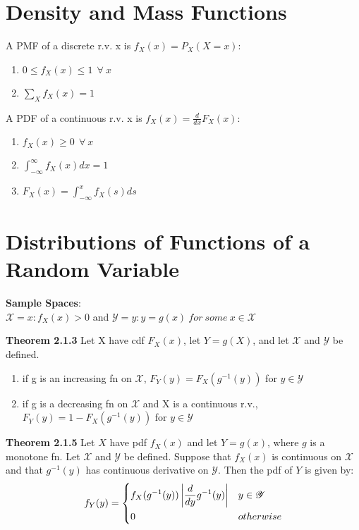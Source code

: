 \documentclass[14pt, oneside, letterpaper]{notes}
\begin{document}
\section*{Density and Mass Functions}

\begin{mydef}
	A PMF of a discrete r.v. x is $f_X(x)=P_X(X=x)$:
	\begin{enumerate}
	\item $0 \leq f_X(x) \leq 1 \: \: \forall \: x$
	\item $\sum_X f_X(x) = 1$
	\end{enumerate}
\end{mydef}

\begin{mydef}
	A PDF of a continuous r.v. x is $f_X(x)= \frac{d}{dx}F_X(x)$:
	\begin{enumerate}
	\item $f_X(x) \geq 0 \: \: \forall \: x$
	\item $\int_{-\infty}^{\infty}f_X(x)dx = 1$
	\item $F_X(x) = \int_{-\infty}^{x}f_X(s)ds $
	\end{enumerate}
\end{mydef}

\section*{Distributions of Functions of a Random Variable}

\begin{mydef}
	\textbf{Sample Spaces}: \\ 
	$\mathscr{X} = {x: f_X(x) > 0}$ and 
	$\mathscr{Y} = {y: y=g(x) \: for \: some \: x \in \mathscr{X}}$
\end{mydef}


\begin{remark}
	\textbf{Theorem 2.1.3} Let X have cdf $F_X(x)$, let $Y = g(X)$,
	and let $\mathscr{X}$ and $\mathscr{Y}$ be defined.
	\begin{enumerate}
	\item if g is an increasing fn on $\mathscr{X}$, $F_Y(y) = 
	F_X(g^{-1}(y)) $ for $y \in \mathscr{Y}$
	\item if g is a decreasing fn on $\mathscr{X}$ and X is
	a continuous r.v., $F_Y(y) = 1- F_X(g^{-1}(y)) $ for 
	$y \in \mathscr{Y}$
	\end{enumerate}
\end{remark}

\begin{remark}
	\textbf{Theorem 2.1.5} Let $X$ have pdf $f_X(x)$ and let $Y = g(x)$,
	where $g$ is a monotone fn.  Let $\mathscr{X}$ and $\mathscr{Y}$ be
	defined.  Suppose that $f_X(x)$ is continuous on $\mathscr{X}$ and
	that $g^{-1}(y)$ has continuous derivative on $\mathscr{Y}$. Then
	the pdf of $Y$ is given by:
	\[ f_Y(y) =  
		\begin{dcases}
			f_X(g^{-1}(y)) \left| \frac{d}{dy}g^{-1}(y)\right| 
			& y \in \mathscr{Y} \\
			0 & otherwise
		\end{dcases}	
	\]
	
\end{remark}
\end{document}
